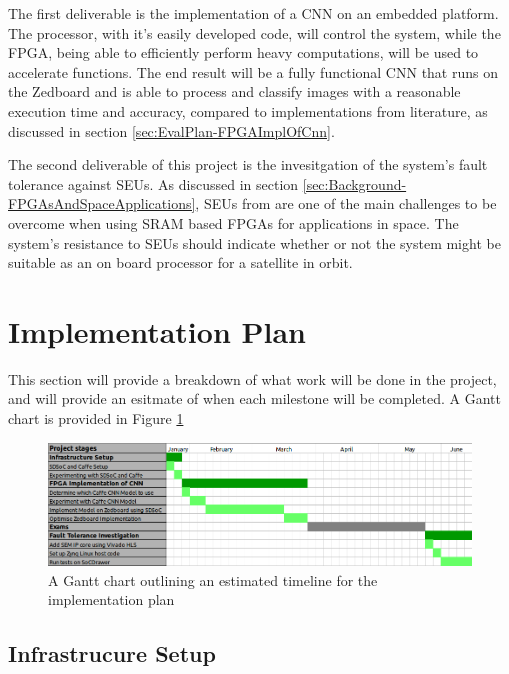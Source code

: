 \documentclass[12pt]{article}
\begin{document}
The first deliverable is the implementation of a CNN on an embedded platform.  The processor, with it's easily developed code, will control the system, while the FPGA, being able to efficiently perform heavy computations, will be used to accelerate functions. The end result will be a fully functional CNN that runs on the Zedboard and is able to process and classify images with a reasonable execution time and accuracy, compared to implementations from literature, as discussed in section \ref{sec:EvalPlan-FPGAImplOfCnn}.

The second deliverable of this project is the invesitgation of the system's fault tolerance against SEUs. As discussed in section \ref{sec:Background-FPGAsAndSpaceApplications}, SEUs from are one of the main challenges to be overcome when using SRAM based FPGAs for applications in space. The system's resistance to SEUs should indicate whether or not the system might be suitable as an on board processor for a satellite in orbit.

\section{Implementation Plan}
\label{sec:ImpPlan}
\vspace{-12pt}

This section will provide a breakdown of what work will be done in the project, and will provide an esitmate of when each milestone will be completed. A Gantt chart is provided in Figure \ref{fig:gantt}
\begin{figure}

\centering
\includegraphics[width=1\textwidth]{../figures/gantt}

  \caption{A Gantt chart outlining an estimated timeline for the implementation plan \label{fig:gantt}}

\end{figure}

\subsection{Infrastrucure Setup}
\label{sec:ImpPlan-InfSetup}
\vspace{-12pt}
\end{document}

